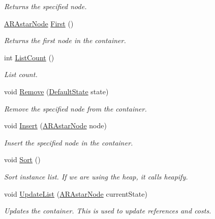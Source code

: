 \begin{DoxyCompactItemize}
\begin{DoxyCompactList}\small\item\em Returns the specified node. \end{DoxyCompactList}\item 
\hyperlink{class_a_r_astar_node}{A\-R\-Astar\-Node} \hyperlink{class_open_container_a19e53059762a7f0aa5bb5a96fe31506d}{First} ()
\begin{DoxyCompactList}\small\item\em Returns the first node in the container. \end{DoxyCompactList}\item 
int \hyperlink{class_open_container_abd9ac817ab140603feee84f8995a27a0}{List\-Count} ()
\begin{DoxyCompactList}\small\item\em List count. \end{DoxyCompactList}\item 
void \hyperlink{class_open_container_a5f585b8681b2e0425119f7a59caf362e}{Remove} (\hyperlink{class_default_state}{Default\-State} state)
\begin{DoxyCompactList}\small\item\em Remove the specified node from the container. \end{DoxyCompactList}\item 
void \hyperlink{class_open_container_a3cd8532faf8cf40de6b89fb57c685df8}{Insert} (\hyperlink{class_a_r_astar_node}{A\-R\-Astar\-Node} node)
\begin{DoxyCompactList}\small\item\em Insert the specified node in the container. \end{DoxyCompactList}\item 
void \hyperlink{class_open_container_a09946014eab624c239cce93a85988071}{Sort} ()
\begin{DoxyCompactList}\small\item\em Sort instance list. If we are using the heap, it calls heapify. \end{DoxyCompactList}\item 
void \hyperlink{class_open_container_ac3edc61c5f1a9b66c3f7c7acd0640e0d}{Update\-List} (\hyperlink{class_a_r_astar_node}{A\-R\-Astar\-Node} current\-State)
\begin{DoxyCompactList}\small\item\em Updates the container. This is used to update references and costs. \end{DoxyCompactList}\item 

\end{DoxyCompactItemize}
